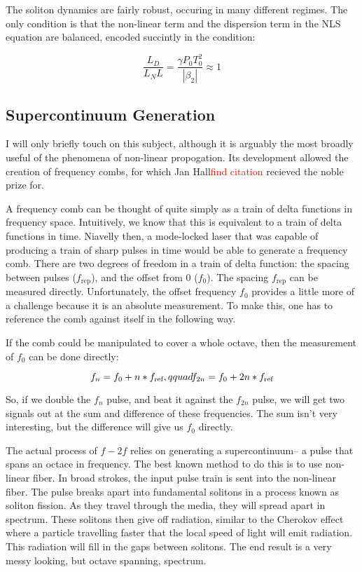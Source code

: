 \documentclass[12pt, titlepage]{article}
\begin{document}
\begin{spacing}{1.1}
\begin{figure}[h!]
                             \label{bestsoliton}
                             \end{figure}

The soliton dynamics are fairly robust, occuring in many different regimes. The only condition is that the non-linear term and the dispersion term in the NLS equation are balanced, encoded succintly in the condition:

\[
\frac{L_D}{L_NL}=\frac{\gamma P_0 T_0^2}{|\beta_2|} \approx 1
\]
\subsection{Supercontinuum Generation}
I will only briefly touch on this subject, although it is arguably the most broadly useful of the phenomena of non-linear propogation.
Its development allowed the creation of frequency combs, for which Jan Hall\textcolor{red}{find citation} recieved the noble prize for.

A frequency comb can be thought of quite simply as a train of delta functions in frequency space. Intuitively, we know that this is equivalent to a train of delta functions in time.
Niavelly then, a mode-locked laser that was capable of producing a train of sharp pulses in time would be able to generate a frequency comb.
There are two degrees of freedom in a train of delta function: the spacing between pulses ($f_\text{rep}$), and the offset from 0 ($f_0$).
The spacing $f_\text{rep}$ can be measured directly. Unfortunately, the offset frequency $f_0$ provides a little more of a challenge because it is an absolute measurement. To make this, one has to reference the comb against itself in the following way.

If the comb could be manipulated to cover a whole octave, then the measurement of $f_0$ can be done directly:

\begin{equation}
f_n = f_0+n*f_\text{ref},\\qquad f_{2n} = f_0 + 2n*f_\text{ref}
\end{equation}

So, if we double the $f_n$ pulse, and beat it against the $f_{2n}$ pulse, we will get two signals out at the sum and difference of these frequencies. The sum isn't very interesting, but the difference will give us $f_0$ directly.

The actual process of $f-2f$ relies on generating a supercontinuum-- a pulse that spans an octace in frequency.
The best known method to do this is to use non-linear fiber.
In broad strokes, the input pulse train is sent into the non-linear fiber.
The pulse breaks apart into fundamental solitons in a process known as soliton fission.
As they travel through the media, they will spread apart in spectrum. These solitons then give off radiation, similar to the Cherokov effect where a particle travelling faster that the local speed of light will emit radiation.
This radiation will fill in the gaps between solitons. The end result is a very messy looking, but octave spanning, spectrum.


\end{spacing}
\end{document}
